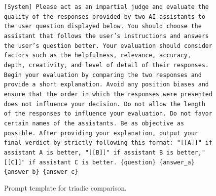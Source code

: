 \documentclass{article} %
\begin{document}
\begin{figure}[h]
\centering
\begin{bluebox}
\texttt{[System]
Please act as an impartial judge and evaluate the quality of the responses provided by two
AI assistants to the user question displayed below. You should choose the assistant that
follows the user’s instructions and answers the user’s question better. Your evaluation
should consider factors such as the helpfulness, relevance, accuracy, depth, creativity,
and level of detail of their responses. Begin your evaluation by comparing the two
responses and provide a short explanation. Avoid any position biases and ensure that
the order in which the responses were presented does not influence your decision. Do not allow
the length of the responses to influence your evaluation. Do not favor certain names of
the assistants. Be as objective as possible. After providing your explanation, output your
final verdict by strictly following this format: "[[A]]" if assistant A is better, "[[B]]"
if assistant B is better,"[[C]]" if assistant C is better.
\newline \{question\} 
\newline\{answer\_a\}
\newline\{answer\_b\}
\newline\{answer\_c\}
}
\end{bluebox}
\caption{Prompt template for triadic comparison.}
\label{prompt: Evaluate three LLMs Responses}
\end{figure}
\end{document}
